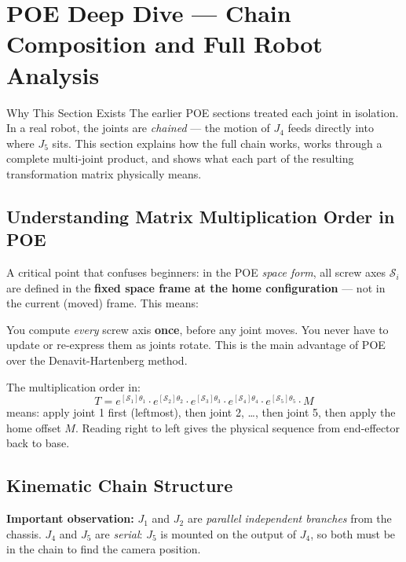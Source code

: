 \documentclass[12pt,a4paper]{article}
\begin{document}
\newpage
\appendix
\section{POE Deep Dive --- Chain Composition and Full Robot Analysis}

\begin{conceptbox}{Why This Section Exists}
The earlier POE sections treated each joint in isolation. In a real robot, the
joints are \emph{chained} --- the motion of $J_4$ feeds directly into where
$J_5$ sits. This section explains how the full chain works, works through a
complete multi-joint product, and shows what each part of the resulting
transformation matrix physically means.
\end{conceptbox}

\subsection{Understanding Matrix Multiplication Order in POE}

A critical point that confuses beginners: in the POE \emph{space form}, all
screw axes $\mathcal{S}_i$ are defined in the \textbf{fixed space frame at the
home configuration} --- not in the current (moved) frame. This means:

\begin{resultbox}
\centering
You compute \emph{every} screw axis \textbf{once}, before any joint moves.
You never have to update or re-express them as joints rotate.
This is the main advantage of POE over the Denavit-Hartenberg method.
\end{resultbox}

\vspace{6pt}

The multiplication order in:
\[
  T = e^{[\mathcal{S}_1]\theta_1}
    \cdot e^{[\mathcal{S}_2]\theta_2}
    \cdot e^{[\mathcal{S}_3]\theta_3}
    \cdot e^{[\mathcal{S}_4]\theta_4}
    \cdot e^{[\mathcal{S}_5]\theta_5}
    \cdot M
\]
means: apply joint 1 first (leftmost), then joint 2, \ldots, then joint 5, then
apply the home offset $M$. Reading right to left gives the physical sequence
from end-effector back to base.

\subsection{Kinematic Chain Structure}

\textbf{Important observation:} $J_1$ and $J_2$ are \emph{parallel independent
branches} from the chassis. $J_4$ and $J_5$ are \emph{serial}: $J_5$ is mounted
on the output of $J_4$, so both must be in the chain to find the camera position.
\end{document}
